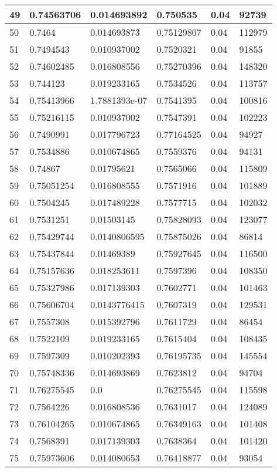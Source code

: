 \begin{longtable}{|l|l|l|l|l|l|}
49 & 0.74563706 & 0.014693892 & 0.750535 & 0.04 & 92739 \\ \hline 
50 & 0.7464 & 0.014693873 & 0.75129807 & 0.04 & 112979 \\ \hline 
51 & 0.7494543 & 0.010937002 & 0.7520321 & 0.04 & 91855 \\ \hline 
52 & 0.74602485 & 0.016808556 & 0.75270396 & 0.04 & 148320 \\ \hline 
53 & 0.744123 & 0.019233165 & 0.7534526 & 0.04 & 113757 \\ \hline 
54 & 0.75413966 & 1.7881393e-07 & 0.7541395 & 0.04 & 100816 \\ \hline 
55 & 0.75216115 & 0.010937002 & 0.7547391 & 0.04 & 102223 \\ \hline 
56 & 0.7490991 & 0.017796723 & 0.77164525 & 0.04 & 94927 \\ \hline 
57 & 0.7534886 & 0.010674865 & 0.7559376 & 0.04 & 94131 \\ \hline 
58 & 0.74867 & 0.01795621 & 0.7565066 & 0.04 & 115809 \\ \hline 
59 & 0.75051254 & 0.016808555 & 0.7571916 & 0.04 & 101889 \\ \hline 
60 & 0.7504245 & 0.017489228 & 0.7577715 & 0.04 & 102032 \\ \hline 
61 & 0.7531251 & 0.01503145 & 0.75828093 & 0.04 & 123077 \\ \hline 
62 & 0.75429744 & 0.0140806595 & 0.75875026 & 0.04 & 86814 \\ \hline 
63 & 0.75437844 & 0.01469389 & 0.75927645 & 0.04 & 116500 \\ \hline 
64 & 0.75157636 & 0.018253611 & 0.7597396 & 0.04 & 108350 \\ \hline 
65 & 0.75327986 & 0.017139303 & 0.7602771 & 0.04 & 101463 \\ \hline 
66 & 0.75606704 & 0.0143776415 & 0.7607319 & 0.04 & 129531 \\ \hline 
67 & 0.7557308 & 0.015392796 & 0.7611729 & 0.04 & 86454 \\ \hline 
68 & 0.7522109 & 0.019233165 & 0.7615404 & 0.04 & 108435 \\ \hline 
69 & 0.7597309 & 0.010202393 & 0.76195735 & 0.04 & 145554 \\ \hline 
70 & 0.75748336 & 0.014693869 & 0.7623812 & 0.04 & 94704 \\ \hline 
71 & 0.76275545 & 0.0 & 0.76275545 & 0.04 & 115598 \\ \hline 
72 & 0.7564226 & 0.016808536 & 0.7631017 & 0.04 & 124089 \\ \hline 
73 & 0.76104265 & 0.010674865 & 0.76349163 & 0.04 & 101408 \\ \hline 
74 & 0.7568391 & 0.017139303 & 0.7638364 & 0.04 & 101420 \\ \hline 
75 & 0.75973606 & 0.014080653 & 0.76418877 & 0.04 & 93054 \\ \hline 
\end{longtable}